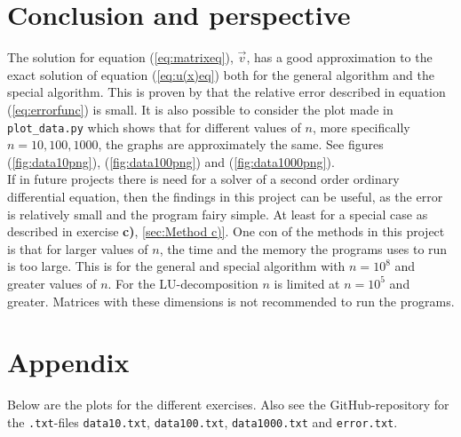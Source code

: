 \documentclass{article}
\begin{document}
\vspace{1cm}

\section{Conclusion and perspective} \label{sec:Conclusion}

  The solution for equation (\ref{eq:matrixeq}), $\vec{v}$, has a good approximation to the exact solution of equation (\ref{eq:u(x)eq}) both for the general algorithm and the special algorithm. This is proven by that the relative error described in equation (\ref{eq:errorfunc}) is small. It is also possible to consider the plot made in \texttt{plot\_data.py} which shows that for different values of $n$, more specifically $n = 10, 100, 1000$, the graphs are approximately the same. See figures (\ref{fig:data10png}),
  (\ref{fig:data100png}) and (\ref{fig:data1000png}). \\

  If in future projects there is need for a solver of a second order ordinary differential equation, then the findings in this project can be useful, as the error is relatively small and the program fairy simple. At least for a special case as described in exercise \textbf{c)}, \ref{sec:Method c)}. One con of the methods in this project is that for larger values of $n$, the time and the memory the programs uses to run is too large. This is for the general and special algorithm with $n = 10^8$ and greater values of $n$. For the LU-decomposition $n$ is limited at $n = 10^5$ and greater. Matrices with these dimensions is not recommended to run the programs.


\vspace{1cm}

\section{Appendix} \label{sec:Appendix}

Below are the plots for the different exercises. Also see the GitHub-repository for the \texttt{.txt}-files \texttt{data10.txt}, \texttt{data100.txt}, \texttt{data1000.txt} and \texttt{error.txt}.
\end{document}
